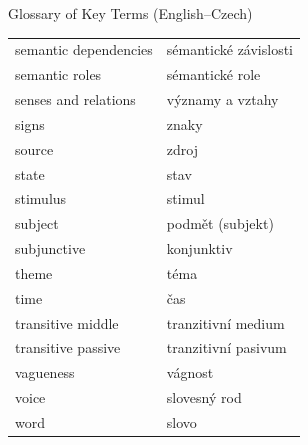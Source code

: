 \begin{frame}[allowframebreaks]{Glossary of Key Terms (English--Czech)}
\begin{longtable}{ll}
 semantic dependencies & sémantické závislosti \\
 semantic roles & sémantické role \\
 senses and relations & významy a vztahy \\
 signs & znaky \\
 source & zdroj \\
 state & stav \\
 stimulus & stimul \\
 subject & podmět (subjekt) \\
 subjunctive & konjunktiv \\
 theme & téma \\
 time & čas \\
 transitive middle & tranzitivní medium \\
 transitive passive & tranzitivní pasivum \\
 vagueness & vágnost \\
 voice & slovesný rod \\
 word & slovo \\
 \end{longtable}
\end{frame}

